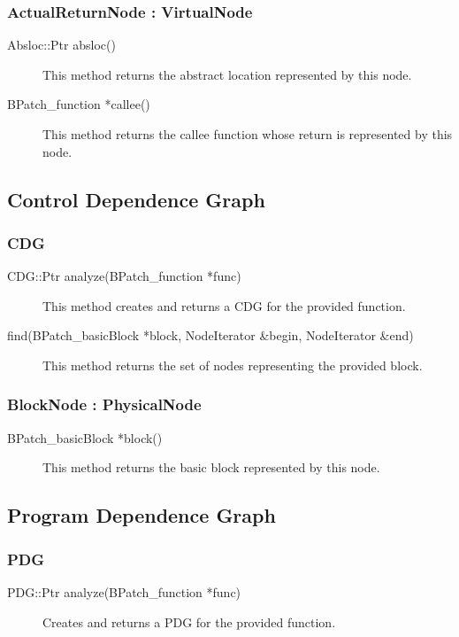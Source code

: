 \documentclass[12pt,titlepage]{article}
\begin{document}
\subsubsection{ActualReturnNode : VirtualNode}
\begin{description}
\item[Absloc::Ptr absloc()]
This method returns the abstract location represented by this node.
\item[BPatch\_function *callee() ]
This method returns the callee function whose return is represented by this node.
\end{description}

\subsection{Control Dependence Graph}
\subsubsection{CDG}
\begin{description}
\item[CDG::Ptr analyze(BPatch\_function *func)]
This method creates and returns a CDG for the provided function.
\item[find(BPatch\_basicBlock *block, NodeIterator \&begin, NodeIterator \&end)]
This method returns the set of nodes representing the provided block.
\end{description}

\subsubsection{BlockNode : PhysicalNode}
\begin{description}
\item[BPatch\_basicBlock *block() ]
This method returns the basic block represented by this node. 
\end{description}

\subsection{Program Dependence Graph}
\subsubsection{PDG}
\begin{description}
\item[PDG::Ptr analyze(BPatch\_function *func)]
Creates and returns a PDG for the provided function.
\end{description}
\end{document}

